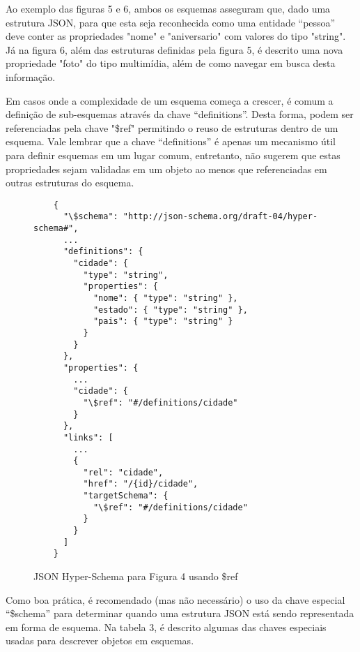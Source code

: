 Ao exemplo das figuras 5 e 6, ambos os esquemas asseguram que, dado uma estrutura JSON, para que esta seja reconhecida como uma entidade “pessoa” deve conter as propriedades "nome" e "aniversario" com valores do tipo "string". Já na figura 6, além das estruturas definidas pela figura 5, é descrito uma nova propriedade "foto" do tipo multimídia, além de como navegar em busca desta informação.

Em casos onde a complexidade de um esquema começa a crescer, é comum a definição de sub-esquemas através da chave “definitions”. Desta forma, podem ser referenciadas pela chave "\$ref" permitindo o reuso de estruturas dentro de um esquema. Vale lembrar que a chave “definitions” é apenas um mecanismo útil para definir esquemas em um lugar comum, entretanto, não sugerem que estas propriedades sejam validadas em um objeto ao menos que referenciadas em outras estruturas do esquema. \cite{Leach2014}

\begin{figure}[H]
  \centering
  \begin{verbatim}
    {
      "\$schema": "http://json-schema.org/draft-04/hyper-schema#",
      ...
      "definitions": {
        "cidade": {
          "type": "string",
          "properties": {
            "nome": { "type": "string" },
            "estado": { "type": "string" },
            "pais": { "type": "string" }
          }
        }
      },
      "properties": {
        ...
        "cidade": {
          "\$ref": "#/definitions/cidade"
        }
      },
      "links": [
        ...
        {
          "rel": "cidade",
          "href": "/{id}/cidade",
          "targetSchema": {
            "\$ref": "#/definitions/cidade"
          }
        }
      ]
    }
  \end{verbatim}
  \caption{JSON Hyper-Schema para Figura 4 usando \$ref}
\end{figure}

Como boa prática, é recomendado (mas não necessário) o uso da chave especial “\$schema” para determinar quando uma estrutura JSON está sendo representada em forma de esquema. Na tabela 3, é descrito algumas das chaves especiais usadas para descrever objetos em esquemas. \cite{Droettboom2015}

